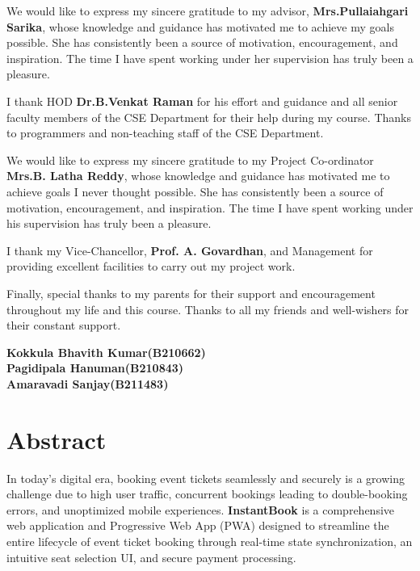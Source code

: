 \documentclass[12pt,a4paper]{report}
\begin{document}
We would like to express my sincere gratitude to my advisor, \textbf{Mrs.Pullaiahgari Sarika}, whose knowledge and guidance has motivated me to achieve my goals possible. She has consistently been a source of motivation, encouragement, and inspiration. The time I have spent working under her supervision has truly been a pleasure.

\vspace{0.5cm}

I thank HOD \textbf{Dr.B.Venkat Raman} for his effort and guidance and all senior faculty members of the CSE Department for their help during my course. Thanks to programmers and non-teaching staff of the CSE Department.

\vspace{0.5cm}

We would like to express my sincere gratitude to my Project Co-ordinator \textbf{Mrs.B. Latha Reddy}, whose knowledge and guidance has motivated me to achieve goals I never thought possible. She has consistently been a source of motivation, encouragement, and inspiration. The time I have spent working under his supervision has truly been a pleasure.

\vspace{0.5cm}

I thank my Vice-Chancellor,\textbf{ Prof. A. Govardhan}, and Management for providing excellent facilities to carry out my project work.

\vspace{0.5cm}

Finally, special thanks to my parents for their support and encouragement throughout my life and this course. Thanks to all my friends and well-wishers for their constant support.

\vspace{1cm}

\begin{flushright}
\textbf{Kokkula Bhavith Kumar(B210662)}\\
\textbf{Pagidipala Hanuman(B210843)}\\
\textbf{Amaravadi Sanjay(B211483)}
\end{flushright}
\clearpage

\chapter*{Abstract}
\noindent
In today's digital era, booking event tickets seamlessly and securely is a growing challenge due to high user traffic, concurrent bookings leading to double-booking errors, and unoptimized mobile experiences. \textbf{InstantBook} is a comprehensive web application and Progressive Web App (PWA) designed to streamline the entire lifecycle of event ticket booking through real-time state synchronization, an intuitive seat selection UI, and secure payment processing.
\end{document}

